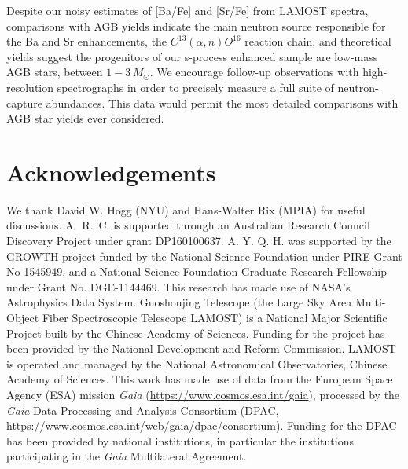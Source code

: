 \documentclass[a4paper,fleqn,usenatbib]{mnras}
\begin{document}
Despite our noisy estimates of [Ba/Fe] and [Sr/Fe] from LAMOST spectra, comparisons with AGB yields indicate the main neutron source responsible for the Ba and Sr enhancements, the $C^{13}(\alpha,n)O^{16}$ reaction chain, and theoretical yields suggest the progenitors of our s-process enhanced sample are low-mass AGB stars, between $1 - 3\,M_{\odot}$. We encourage follow-up observations with high-resolution spectrographs in order to precisely measure a full suite of neutron-capture abundances. This data would permit the most detailed comparisons with AGB star yields ever considered.

 

\section*{Acknowledgements}
We thank David W. Hogg (NYU) and Hans-Walter Rix (MPIA) for useful discussions. 
A.~R.~C. is supported through an Australian Research Council Discovery Project under grant DP160100637.
A. Y. Q. H. was supported by the GROWTH project funded by the National Science Foundation under PIRE Grant No 1545949, and a National Science Foundation Graduate Research Fellowship under Grant No. DGE-1144469. 
This research has made use of NASA's Astrophysics Data System.
Guoshoujing Telescope (the Large Sky Area Multi-Object Fiber Spectroscopic Telescope LAMOST) is a National Major Scientific Project built by the Chinese Academy of Sciences. Funding for the project has been provided by the National Development and Reform Commission. LAMOST is operated and managed by the National Astronomical Observatories, Chinese Academy of Sciences. 
This work has made use of data from the European Space Agency (ESA) mission
{\it Gaia} (\url{https://www.cosmos.esa.int/gaia}), processed by the {\it Gaia}
Data Processing and Analysis Consortium (DPAC,
\url{https://www.cosmos.esa.int/web/gaia/dpac/consortium}). Funding for the DPAC
has been provided by national institutions, in particular the institutions
participating in the {\it Gaia} Multilateral Agreement.


 

\end{document}
